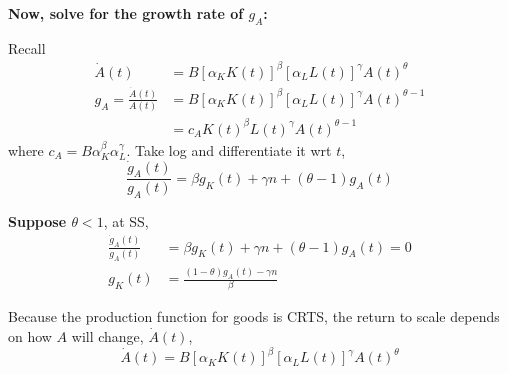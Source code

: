 \documentclass[12pt]{article}
\begin{document}
{{\textbf {Now, solve for the growth rate of $ g_{A} $:}}

Recall
\begin{align*}
\dot{A}(t) &= B[\alpha_{K}K(t)]^{\beta}[\alpha_{L}L(t)]^{\gamma}A(t)^{\theta}\\
g_{A}= \frac{\dot{A}(t)}{A(t)} &= B[\alpha_{K}K(t)]^{\beta}[\alpha_{L}L(t)]^{\gamma}
A(t)^{\theta - 1}\\
&= c_{A}K(t)^{\beta}L(t)^{\gamma}A(t)^{\theta - 1}
\end{align*}
where $ c_{A} = B \alpha_{K}^{\beta}\alpha_{L}^{\gamma} $.
Take log and differentiate it wrt $ t $, 
\begin{equation*}
\frac{\dot{g}_{A}(t)}{g_{A}(t)} = \beta g_{K}(t) + \gamma n  + (\theta - 1)g_{A}(t)
\end{equation*}

{\textbf {Suppose $ \theta < 1 $}},
at SS, 
\begin{align*}
\frac{\dot{g}_{A}(t)}{g_{A}(t)} &= \beta g_{K}(t) + \gamma n  + (\theta - 1)g_{A}(t) = 0
\\
g_{K}(t) &= \frac{(1 - \theta)g_{A}(t) - \gamma n}{\beta}
\end{align*}

\begin{figure}[H]
\end{figure}

Because the production function for goods is CRTS, the return to scale depends on 
how $ A $ will change, $ \dot{A}(t) $,
\begin{equation*}
\dot{A}(t) = B[\alpha_{K}K(t)]^{\beta}[\alpha_{L}L(t)]^{\gamma}A(t)^{\theta}
\end{equation*}


}
\end{document}
